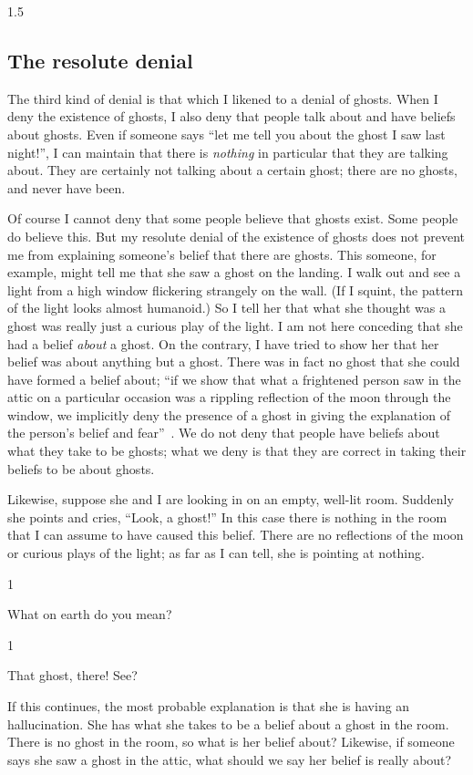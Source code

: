 \documentclass[11pt]{article}
\newcommand{\stage}[3]%
{%
	\begin{spacing}{1}%
	\vspace{0pt}
		\begin{description}[style=nextline, parsep=0pt, leftmargin=15mm, itemindent=-10mm, font=\mdseries]
			\item[\textsc{#1} \emph{#2}] #3
		\end{description}%
	\end{spacing}%
}
\begin{document}
\begin{spacing}{1.5}
\subsection{The resolute denial}
\label{resolute}
The third kind of denial is that which I likened to a denial of ghosts.  When I deny the existence of ghosts, I also deny that people talk about and have beliefs about ghosts.  Even if someone says ``let me tell you about the ghost I saw last night!'', I can maintain that there is {\em nothing} in particular that they are talking about.  They are certainly not talking about a certain ghost; there are no ghosts, and never have been.

Of course I cannot deny that some people believe that ghosts exist.  Some people do believe this.  But my resolute denial of the existence of ghosts does not prevent me from explaining someone's belief that there are ghosts.  This someone, for example, might tell me that she saw a ghost on the landing.  I walk out and see a light from a high window flickering strangely on the wall.  (If I squint, the pattern of the light looks almost humanoid.) So I tell her that what she thought was a ghost was really just a curious play of the light.  I am not here conceding that she had a belief {\em about} a ghost.  On the contrary, I have tried to show her that her belief was about anything but a ghost.  There was in fact no ghost that she could have formed a belief about; ``if we show that what a frightened person saw in the attic on a particular occasion was a rippling reflection of the moon through the window, we implicitly deny the presence of a ghost in giving the explanation of the person's belief and fear''~\citep[76]{stroud2000a}.  We do not deny that people have beliefs about what they take to be ghosts; what we deny is that they are correct in taking their beliefs to be about ghosts.

Likewise, suppose she and I are looking in on an empty, well-lit room.  Suddenly she points and cries, ``Look, a ghost!'' In this case there is nothing in the room that I can assume to have caused this belief.  There are no reflections of the moon or curious plays of the light; as far as I can tell, she is pointing at nothing.

\stage{Me}{}{What on earth do you mean?}

\stage{Her}{(pointing)}{That ghost, there! See?}

If this continues, the most probable explanation is that she is having an hallucination.  She has what she takes to be a belief about a ghost in the room.  There is no ghost in the room, so what is her belief about? Likewise, if someone says she saw a ghost in the attic, what should we say her belief is really about?


\end{spacing}
\end{document}
